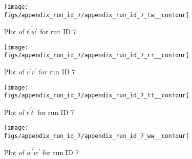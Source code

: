 \begin{figure}[H]
\centering
\texttt{[image: figs/appendix\_run\_id\_7/appendix\_run\_id\_7\_tw\_\_contour]}
\caption{Plot of $\overline{t^\prime w^\prime}$ for run ID 7}
\label{fig:appendix_run_id_7_tw__contour}
\end{figure}


\begin{figure}[H]
\centering
\texttt{[image: figs/appendix\_run\_id\_7/appendix\_run\_id\_7\_rr\_\_contour]}
\caption{Plot of $\overline{r^\prime r^\prime}$ for run ID 7}
\label{fig:appendix_run_id_7_rr__contour}
\end{figure}


\begin{figure}[H]
\centering
\texttt{[image: figs/appendix\_run\_id\_7/appendix\_run\_id\_7\_tt\_\_contour]}
\caption{Plot of $\overline{t^\prime t^\prime}$ for run ID 7}
\label{fig:appendix_run_id_7_tt__contour}
\end{figure}


\begin{figure}[H]
\centering
\texttt{[image: figs/appendix\_run\_id\_7/appendix\_run\_id\_7\_ww\_\_contour]}
\caption{Plot of $\overline{w^\prime w^\prime}$ for run ID 7}
\label{fig:appendix_run_id_7_ww__contour}
\end{figure}


